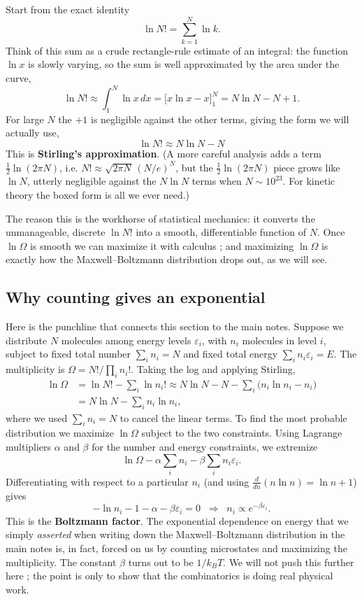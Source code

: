 \documentclass{report}
\numberwithin{equation}{section}
\begin{document}
Start from the exact identity
\begin{equation}
	\ln N! = \sum_{k=1}^{N}\ln k.
\end{equation}
Think of this sum as a crude rectangle-rule estimate of an integral: the function $\ln x$ is slowly varying, so the sum is well approximated by the area under the curve,
\begin{equation}
	\ln N! \approx \int_1^N \ln x\,dx = \big[x\ln x - x\big]_1^N = N\ln N - N + 1.
\end{equation}
For large $N$ the $+1$ is negligible against the other terms, giving the form we will actually use,
\begin{equation}
	\boxed{\;\ln N! \approx N\ln N - N\;}
\end{equation}
This is \textbf{Stirling's approximation}. (A more careful analysis adds a term $\tfrac12\ln(2\pi N)$, i.e. $N!\approx\sqrt{2\pi N}\,(N/e)^N$, but the $\tfrac12\ln(2\pi N)$ piece grows like $\ln N$, utterly negligible against the $N\ln N$ terms when $N\sim 10^{23}$. For kinetic theory the boxed form is all we ever need.)

The reason this is the workhorse of statistical mechanics: it converts the unmanageable, discrete $\ln N!$ into a smooth, differentiable function of $N$. Once $\ln\Omega$ is smooth we can maximize it with calculus ; and maximizing $\ln\Omega$ is exactly how the Maxwell--Boltzmann distribution drops out, as we will see.

\subsection{Why counting gives an exponential}
Here is the punchline that connects this section to the main notes. Suppose we distribute $N$ molecules among energy levels $\varepsilon_i$, with $n_i$ molecules in level $i$, subject to fixed total number $\sum_i n_i = N$ and fixed total energy $\sum_i n_i\varepsilon_i = E$. The multiplicity is $\Omega = N!/\prod_i n_i!$. Taking the log and applying Stirling,
\begin{align*}
	\ln\Omega &= \ln N! - \sum_i \ln n_i!
	\approx N\ln N - N - \sum_i\big(n_i\ln n_i - n_i\big)\\
	&= N\ln N - \sum_i n_i\ln n_i,
\end{align*}
where we used $\sum_i n_i = N$ to cancel the linear terms. To find the most probable distribution we maximize $\ln\Omega$ subject to the two constraints. Using Lagrange multipliers $\alpha$ and $\beta$ for the number and energy constraints, we extremize
\[
	\ln\Omega - \alpha\sum_i n_i - \beta\sum_i n_i\varepsilon_i.
\]
Differentiating with respect to a particular $n_i$ (and using $\frac{d}{dn}(n\ln n) = \ln n + 1$) gives
\[
	-\ln n_i - 1 - \alpha - \beta\varepsilon_i = 0
	\;\;\Longrightarrow\;\;
	n_i \propto e^{-\beta\varepsilon_i}.
\]
This is the \textbf{Boltzmann factor}. The exponential dependence on energy that we simply \emph{asserted} when writing down the Maxwell--Boltzmann distribution in the main notes is, in fact, forced on us by counting microstates and maximizing the multiplicity. The constant $\beta$ turns out to be $1/k_BT$. We will not push this further here ; the point is only to show that the combinatorics is doing real physical work.
\end{document}
